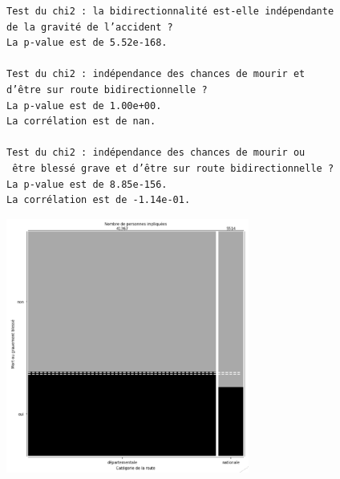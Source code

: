 \documentclass[a4paper]{article}
\theoremstyle{definition}
\theoremstyle{proposition}
\begin{document}
\begin{verbatim}
Test du chi2 : la bidirectionnalité est-elle indépendante 
de la gravité de l’accident ?
La p-value est de 5.52e-168.

Test du chi2 : indépendance des chances de mourir et 
d’être sur route bidirectionnelle ?
La p-value est de 1.00e+00.
La corrélation est de nan.

Test du chi2 : indépendance des chances de mourir ou
 être blessé grave et d’être sur route bidirectionnelle ?
La p-value est de 8.85e-156.
La corrélation est de -1.14e-01.
\end{verbatim}

\includegraphics[width=8cm]{indep_1_test2.png}\label{indep_1_test2}

\end{document}
